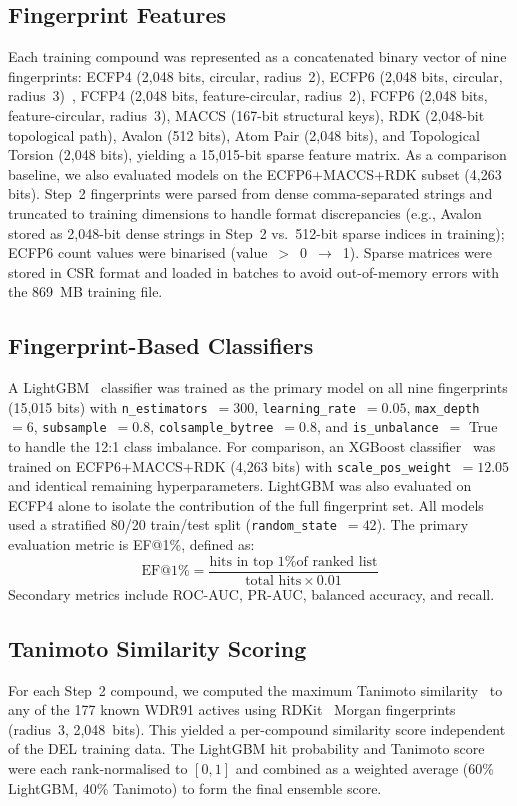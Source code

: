 \documentclass[10pt, letterpaper]{article}
\begin{document}
\subsection{Fingerprint Features}
Each training compound was represented as a concatenated binary vector of nine fingerprints: ECFP4 (2,048 bits, circular, radius~2), ECFP6 (2,048 bits, circular, radius~3)~\cite{Rogers2010}, FCFP4 (2,048 bits, feature-circular, radius~2), FCFP6 (2,048 bits, feature-circular, radius~3), MACCS (167-bit structural keys), RDK (2,048-bit topological path), Avalon (512 bits), Atom Pair (2,048 bits), and Topological Torsion (2,048 bits), yielding a 15,015-bit sparse feature matrix. As a comparison baseline, we also evaluated models on the ECFP6+MACCS+RDK subset (4,263 bits). Step~2 fingerprints were parsed from dense comma-separated strings and truncated to training dimensions to handle format discrepancies (e.g., Avalon stored as 2,048-bit dense strings in Step~2 vs.\ 512-bit sparse indices in training); ECFP6 count values were binarised (value~$>$~0~$\rightarrow$~1). Sparse matrices were stored in CSR format and loaded in batches to avoid out-of-memory errors with the 869~MB training file.

\subsection{Fingerprint-Based Classifiers}
A LightGBM~\cite{Ke2017} classifier was trained as the primary model on all nine fingerprints (15,015 bits) with \texttt{n\_estimators}~$= 300$, \texttt{learning\_rate}~$= 0.05$, \texttt{max\_depth}~$= 6$, \texttt{subsample}~$= 0.8$, \texttt{colsample\_bytree}~$= 0.8$, and \texttt{is\_unbalance}~$=$ True to handle the 12:1 class imbalance. For comparison, an XGBoost classifier~\cite{Chen2016} was trained on ECFP6+MACCS+RDK (4,263 bits) with \texttt{scale\_pos\_weight}~$= 12.05$ and identical remaining hyperparameters. LightGBM was also evaluated on ECFP4 alone to isolate the contribution of the full fingerprint set. All models used a stratified 80/20 train/test split (\texttt{random\_state}~$= 42$). The primary evaluation metric is EF@1\%, defined as:
\begin{equation}
\text{EF@1\%} = \frac{\text{hits in top 1\% of ranked list}}{\text{total hits} \times 0.01}
\end{equation}
Secondary metrics include ROC-AUC, PR-AUC, balanced accuracy, and recall.

\subsection{Tanimoto Similarity Scoring}
For each Step~2 compound, we computed the maximum Tanimoto similarity~\cite{Tanimoto1958} to any of the 177 known WDR91 actives using RDKit~\cite{RDKit} Morgan fingerprints (radius~3, 2,048~bits). This yielded a per-compound similarity score independent of the DEL training data. The LightGBM hit probability and Tanimoto score were each rank-normalised to $[0,1]$ and combined as a weighted average (60\% LightGBM, 40\% Tanimoto) to form the final ensemble score.
\end{document}
